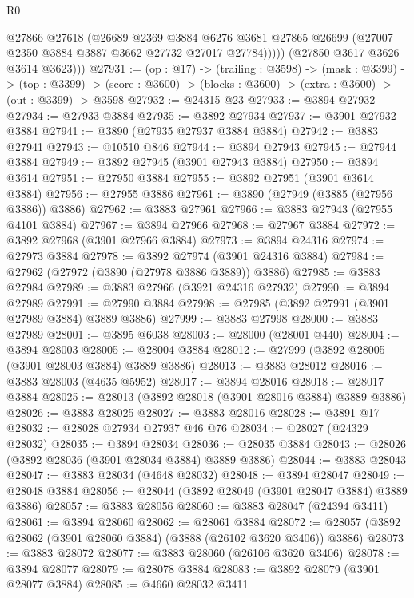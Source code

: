 \begin{lexlean}{R0}
\begin{coremodule}
              @27866
              @27618
              (@26689
                @2369
                @3884
                @6276
                @3681
                @27865
                @26699
                (@27007 @2350 @3884 @3887 @3662 @27732 @27017 @27784)))))
        (@27850 @3617 @3626 @3614 @3623)))
@27931 := (op : @17) ->
  (trailing : @3598) ->
  (mask : @3399) ->
  (top : @3399) -> (score : @3600) -> (blocks : @3600) -> (extra : @3600) -> (out : @3399) -> @3598
@27932 := @24315 @23
@27933 := @3894 @27932
@27934 := @27933 @3884
@27935 := @3892 @27934
@27937 := @3901 @27932 @3884
@27941 := @3890 (@27935 @27937 @3884 @3884)
@27942 := @3883 @27941
@27943 := @10510 @846
@27944 := @3894 @27943
@27945 := @27944 @3884
@27949 := @3892 @27945 (@3901 @27943 @3884)
@27950 := @3894 @3614
@27951 := @27950 @3884
@27955 := @3892 @27951 (@3901 @3614 @3884)
@27956 := @27955 @3886
@27961 := @3890 (@27949 (@3885 (@27956 @3886)) @3886)
@27962 := @3883 @27961
@27966 := @3883 @27943 (@27955 @4101 @3884)
@27967 := @3894 @27966
@27968 := @27967 @3884
@27972 := @3892 @27968 (@3901 @27966 @3884)
@27973 := @3894 @24316
@27974 := @27973 @3884
@27978 := @3892 @27974 (@3901 @24316 @3884)
@27984 := @27962 (@27972 (@3890 (@27978 @3886 @3889)) @3886)
@27985 := @3883 @27984
@27989 := @3883 @27966 (@3921 @24316 @27932)
@27990 := @3894 @27989
@27991 := @27990 @3884
@27998 := @27985 (@3892 @27991 (@3901 @27989 @3884) @3889 @3886)
@27999 := @3883 @27998
@28000 := @3883 @27989
@28001 := @3895 @6038
@28003 := @28000 (@28001 @440)
@28004 := @3894 @28003
@28005 := @28004 @3884
@28012 := @27999 (@3892 @28005 (@3901 @28003 @3884) @3889 @3886)
@28013 := @3883 @28012
@28016 := @3883 @28003 (@4635 @5952)
@28017 := @3894 @28016
@28018 := @28017 @3884
@28025 := @28013 (@3892 @28018 (@3901 @28016 @3884) @3889 @3886)
@28026 := @3883 @28025
@28027 := @3883 @28016
@28028 := @3891 @17
@28032 := @28028 @27934 @27937 @46 @76
@28034 := @28027 (@24329 @28032)
@28035 := @3894 @28034
@28036 := @28035 @3884
@28043 := @28026 (@3892 @28036 (@3901 @28034 @3884) @3889 @3886)
@28044 := @3883 @28043
@28047 := @3883 @28034 (@4648 @28032)
@28048 := @3894 @28047
@28049 := @28048 @3884
@28056 := @28044 (@3892 @28049 (@3901 @28047 @3884) @3889 @3886)
@28057 := @3883 @28056
@28060 := @3883 @28047 (@24394 @3411)
@28061 := @3894 @28060
@28062 := @28061 @3884
@28072 := @28057 (@3892 @28062 (@3901 @28060 @3884) (@3888 (@26102 @3620 @3406)) @3886)
@28073 := @3883 @28072
@28077 := @3883 @28060 (@26106 @3620 @3406)
@28078 := @3894 @28077
@28079 := @28078 @3884
@28083 := @3892 @28079 (@3901 @28077 @3884)
@28085 := @4660 @28032 @3411

\end{coremodule}
\end{lexlean}
